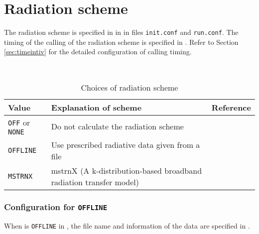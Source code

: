 




\section{Radiation scheme} \label{sec:basic_usel_radiation}
The radiation scheme is specified in  in  in files \verb|init.conf| and \verb|run.conf|. The timing of the calling of the radiation scheme is specified in .  Refer to Section \ref{sec:timeintiv} for the detailed configuration of calling timing.

\\

\begin{table}[h]
\begin{center}
  \caption{Choices of radiation scheme}
  \label{tab:nml_atm_rd}
  \begin{tabularx}{150mm}{lXX} \hline
    \rowcolor[gray]{0.9}  Value & Explanation of scheme & Reference\\ \hline
      \verb|OFF| or \verb|NONE| & Do not calculate the radiation scheme & \\
      \verb|OFFLINE|      & Use prescribed radiative data given from a file & \\
      \verb|MSTRNX|       & mstrnX (A k-distribution-based broadband radiation transfer model) & \citet{sekiguchi_2008} \\
    \hline
  \end{tabularx}
\end{center}
\end{table}

\subsubsection{Configuration for \texttt{OFFLINE}}

When  is \verb|OFFLINE| in ,
the file name and information of the data are specified in .

